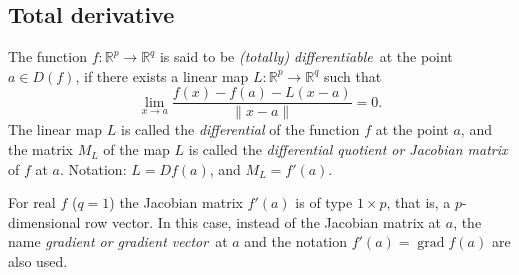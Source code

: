 \documentclass[margin=0px]{article}
\newcommand{\R}{\mathbb{R}}
\begin{document}
\subsection{Total derivative}
\rm The function $ f: \R^p \to \R^q $ is said to be {\it (totally) differentiable\,} at the point $a\in D(f)$,
if there exists a linear map $ L: \R^p \to \R^q $ such that
$$
    \lim_{x\to a}\frac{f(x)-f(a)-L(x-a)}{\|x-a\|}=0.
$$
The linear map $L$ is called the {\it differential} of the function $f$ at the point $a$, and the matrix $M_L$ of the map $L$ is called
the {\it differential quotient or Jacobian matrix\,} of $f$ at $a$. Notation: $L=Df(a)$, and $M_L=f'(a)$.

For real $f$ ($q=1$) the Jacobian matrix $f'(a)$ is of type $1\times p$, that is, a $p$-dimensional row vector. In this case, instead of the
Jacobian matrix at $a$, the name {\it gradient {\rm or} gradient vector\,} at $a$ and the notation $f'(a)=\operatorname{grad} f(a)$
are also used.
\end{document}
